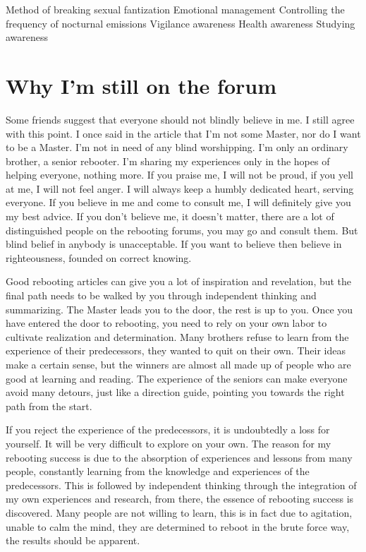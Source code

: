 \documentclass[
]{book}
\begin{document}
Method of breaking sexual fantization
Emotional management
Controlling the frequency of nocturnal emissions
Vigilance awareness
Health awareness
Studying awareness

\hypertarget{why-im-still-on-the-forum}{%
\section{Why I'm still on the forum}\label{why-im-still-on-the-forum}}

Some friends suggest that everyone should not blindly believe in me. I still agree with this point. I once said in the article that I'm not some Master, nor do I want to be a Master. I'm not in need of any blind worshipping. I'm only an ordinary brother, a senior rebooter. I'm sharing my experiences only in the hopes of helping everyone, nothing more. If you praise me, I will not be proud, if you yell at me, I will not feel anger. I will always keep a humbly dedicated heart, serving everyone. If you believe in me and come to consult me, I will definitely give you my best advice. If you don't believe me, it doesn't matter, there are a lot of distinguished people on the rebooting forums, you may go and consult them. But blind belief in anybody is unacceptable. If you want to believe then believe in righteousness, founded on correct knowing.

Good rebooting articles can give you a lot of inspiration and revelation, but the final path needs to be walked by you through independent thinking and summarizing. The Master leads you to the door, the rest is up to you. Once you have entered the door to rebooting, you need to rely on your own labor to cultivate realization and determination. Many brothers refuse to learn from the experience of their predecessors, they wanted to quit on their own. Their ideas make a certain sense, but the winners are almost all made up of people who are good at learning and reading. The experience of the seniors can make everyone avoid many detours, just like a direction guide, pointing you towards the right path from the start.

If you reject the experience of the predecessors, it is undoubtedly a loss for yourself. It will be very difficult to explore on your own. The reason for my rebooting success is due to the absorption of experiences and lessons from many people, constantly learning from the knowledge and experiences of the predecessors. This is followed by independent thinking through the integration of my own experiences and research, from there, the essence of rebooting success is discovered. Many people are not willing to learn, this is in fact due to agitation, unable to calm the mind, they are determined to reboot in the brute force way, the results should be apparent.
\end{document}
